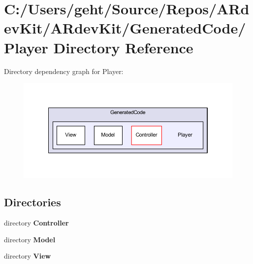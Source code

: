 \section{C\-:/\-Users/geht/\-Source/\-Repos/\-A\-Rdev\-Kit/\-A\-Rdev\-Kit/\-Generated\-Code/\-Player Directory Reference}
\label{dir_e9c6ce3d75d5f98d92bf11344e0f0e0d}
Directory dependency graph for Player\-:
\nopagebreak
\begin{figure}[H]
\begin{center}
\leavevmode
\includegraphics[width=350pt]{dir_e9c6ce3d75d5f98d92bf11344e0f0e0d_dep}
\end{center}
\end{figure}
\subsection*{Directories}
\begin{DoxyCompactItemize}
\item 
directory {\bf Controller}
\item 
directory {\bf Model}
\item 
directory {\bf View}
\end{DoxyCompactItemize}
